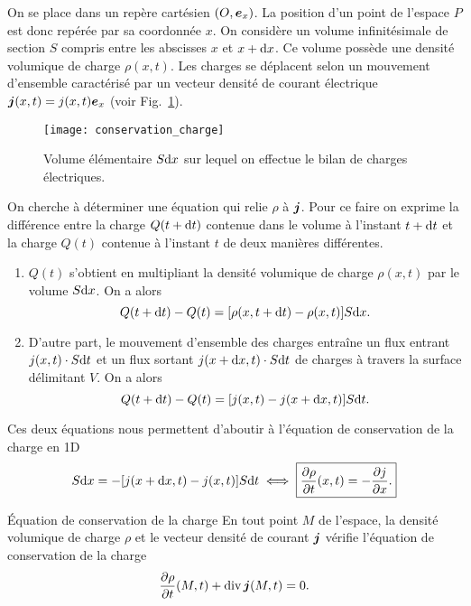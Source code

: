 On se place dans un repère cartésien $(O, \ex)$. La position d'un point 
de l'espace $P$ est donc repérée par sa coordonnée $x$. On considère un volume
infinitésimale de section $S$ compris entre les abscisses $x$ et $x + \mathrm{d}x$.
Ce volume possède une densité volumique de charge $\rho(x, t)$. Les charges se 
déplacent selon un mouvement d'ensemble caractérisé par un vecteur densité de 
courant électrique $\vecj(x, t) = j(x, t)\ex$ 
(voir Fig.~\ref{fig:conservation_charge}). 

\begin{figure}[htpb]
	\centering
	\texttt{[image: conservation\_charge]}
	\caption{Volume élémentaire $S\mathrm{d}x$ sur lequel on effectue le bilan
	de charges électriques.}
	\label{fig:conservation_charge}
\end{figure}
On cherche à déterminer une équation qui relie $\rho$ à $\vecj$. Pour ce faire
on exprime la différence entre la charge $Q(t + \mathrm{d}t)$ contenue dans le volume
à l'instant $t + \mathrm{d}t$ et la charge $Q(t)$ contenue à l'instant $t$ de deux manières
différentes.

\begin{enumerate}
	\item $Q(t)$ s'obtient en multipliant la densité volumique de charge $\rho(x, t)$
	par le volume $S \mathrm{d}x$. On a alors 
	\begin{equation*}
		Q(t + \mathrm{d}t) - Q(t) = [\rho(x, t + \mathrm{d}t) - \rho(x, t)] S\mathrm{d}x.
	\end{equation*}

	\item D'autre part, le mouvement d'ensemble des charges entraîne un 
	  flux entrant $j(x, t) \cdot S \mathrm{d}t$ et un flux sortant 
	  $j(x + \mathrm{d}x, t) \cdot S \mathrm{d}t$ de charges à travers la
	  surface délimitant $V$. On a alors
	  \begin{equation*}
		  Q(t + \mathrm{d}t) - Q(t) = [j(x, t) - j(x + \mathrm{d}x, t)]S \mathrm{d}t.
	  \end{equation*}
\end{enumerate}
Ces deux équations nous permettent d'aboutir à l'équation de conservation de la
charge en 1D
\begin{equation*}
	[\rho(x, t + \dt) - \rho(x, t)] S \dx = -[j(x + \dx, t) - j(x, t)] S \dt
	\iff \boxed{\dd{\rho}{t}(x, t) = - \dd{j}{x}.}
\end{equation*}

\begin{defn}{Équation de conservation de la charge}
	En tout point $M$ de l'espace, la densité volumique de charge $\rho$
	et le vecteur densité de courant $\vecj$ 
	vérifie l'équation de conservation de la charge
	\begin{equation*}
		\dd{\rho}{t}(M, t) + \div \vecj(M, t) = 0.
	\end{equation*}
\end{defn}

